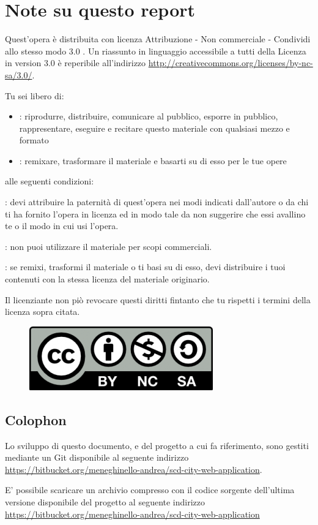 %
\section*{Note su questo report}
\label{note_su_questo_report}
Quest'opera è distribuita con licenza   Attribuzione - Non commerciale - Condividi allo stesso modo 3.0 . Un riassunto in linguaggio accessibile a tutti della Licenza in version 3.0 è reperibile all'indirizzo \url{http://creativecommons.org/licenses/by-nc-sa/3.0/}.

Tu sei libero di:
\begin{itemize}
\item{: riprodurre, distribuire, comunicare al pubblico, esporre in pubblico, rappresentare, eseguire e recitare questo materiale con qualsiasi mezzo e formato}
\item{: remixare, trasformare il materiale e basarti su di esso per le tue opere}
\end{itemize}
alle seguenti condizioni:

: devi attribuire la paternità di quest'opera nei modi indicati dall'autore o da chi ti ha fornito l'opera in licenza ed in modo tale da non suggerire che essi avallino te o il modo in cui usi l'opera.

: non puoi utilizzare il materiale per scopi commerciali.

: se remixi, trasformi il materiale o ti basi su di esso, devi distribuire i tuoi contenuti con la stessa licenza del materiale originario. 

Il licenziante non piò revocare questi diritti fintanto che tu rispetti i termini della licenza sopra citata.

\begin{figure}[h]
\centerline{\includegraphics[scale=0.3]{images/abstract/cc-by-nc-sa.png}}
\end{figure}

\subsection*{Colophon}
\label{colophon}
Lo sviluppo di questo documento, e del progetto a cui fa riferimento, sono gestiti mediante un  Git disponibile al seguente indirizzo \url{https://bitbucket.org/meneghinello-andrea/scd-city-web-application}.

E' possibile scaricare un archivio compresso con il codice sorgente dell'ultima versione disponibile del progetto al seguente indirizzo \url{https://bitbucket.org/meneghinello-andrea/scd-city-web-application}